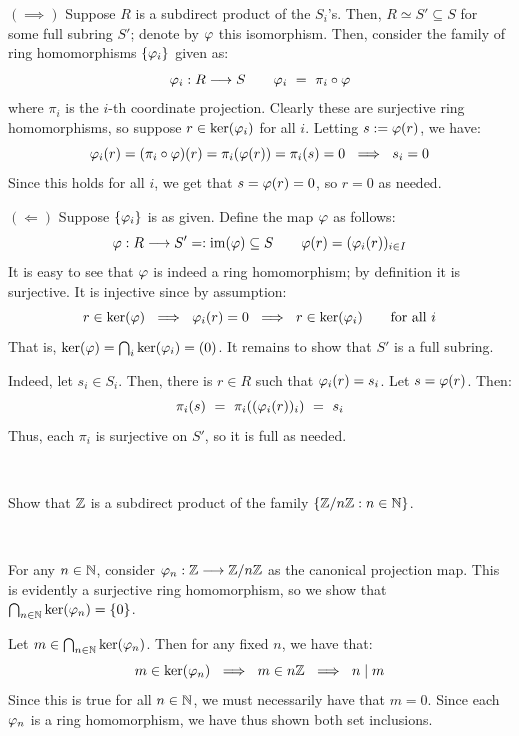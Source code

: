 \begin{pf}
	$(\implies)$ Suppose $R$ is a subdirect product of the $S_{i}$'s.
	Then, $R\simeq S'\subseteq S$ for some full subring $S'$; denote by $\varphi$
	this isomorphism.
	Then, consider the family of ring homomorphisms $\left\{{\varphi_{i}}\right\}$ given as:
	\begin{equation*}
		\vphi_{i}:R\gto S \qquad \vphi_{i} \ = \ \pi_{i}\circ\vphi
	\end{equation*}
	where $\pi_{i}$ is the $i$-th coordinate projection.
	Clearly these are surjective ring homomorphisms, so suppose $r\in\ker(\varphi_{i})$
	for all $i$.
	Letting $s:=\varphi(r)$, we have:
	\begin{equation*}
		\varphi_{i}(r) = (\pi_{i}\circ\varphi)(r) = \pi_{i}(\varphi(r)) = \pi_{i}(s) = 0
		\ \implies \ s_{i}=0
	\end{equation*}
	Since this holds for all $i$, we get that $s = \varphi(r)=0$, so $r=0$ as needed.

	$(\Longleftarrow)$ Suppose $\left\{{\varphi_{i}}\right\}$ is as given.
	Define the map $\varphi$ as follows:
	\begin{equation*}
		\varphi:R\longrightarrow S'=:\operatorname{im}(\varphi)\subseteq S \qquad
		\varphi(r) = (\varphi_{i}(r))_{i\in I}
	\end{equation*}
	It is easy to see that $\varphi$ is indeed a ring homomorphism;
	by definition it is surjective. It is injective since by assumption:
	\begin{equation*}
		r \in \ker(\vphi) \ \implies \ \vphi_{i}(r) = 0 \ \implies \ r\in\ker(\vphi_{i}) \qquad
		\trm{for all } i
	\end{equation*}
	That is, $\ker(\varphi)=\bigcap_{i}\ker(\varphi_{i})=(0)$.
	It remains to show that $S'$ is a full subring.

	Indeed, let $s_{i}\in S_{i}$.
	Then, there is $r\in R$ such that $\varphi_{i}(r)=s_{i}$.
	Let $s = \varphi(r)$. Then:
	\begin{equation*}
		\pi_{i}(s) \ = \ \pi_{i}((\varphi_{i}(r))_{i}) \ = \ s_{i}
	\end{equation*}
	Thus, each $\pi_{i}$ is surjective on $S'$, so it is full as needed.
\end{pf} \

\begin{exr}
	Show that $\mathbb{Z}$ is a subdirect product of the family $\{\mathbb{Z}/n\mathbb{Z} : n\in\mathbb{N}\}$.
\end{exr} \

\begin{pf}
	For any $n \in\mathbb{N}$, consider $\varphi_{n}:\mathbb{Z}\longrightarrow\mathbb{Z}/n\mathbb{Z}$ as the canonical
	projection map.
	This is evidently a surjective ring homomorphism, so we show that
	$\bigcap_{n \in\mathbb{N}}\ker(\varphi_{n})=\left\{{0}\right\}$.

	Let $m \in\bigcap_{n \in\mathbb{N}}\ker(\varphi_{n})$.
	Then for any fixed $n$, we have that:
	\begin{equation*}
		m \in\ker(\vphi_{n}) \ \implies \ m \in n\bZ \ \implies \ n \mid m
	\end{equation*}
	Since this is true for all $n \in\mathbb{N}$, we must necessarily have that $m=0$.
	Since each $\varphi_{n}$ is a ring homomorphism, we have thus shown
	both set inclusions.
\end{pf}

